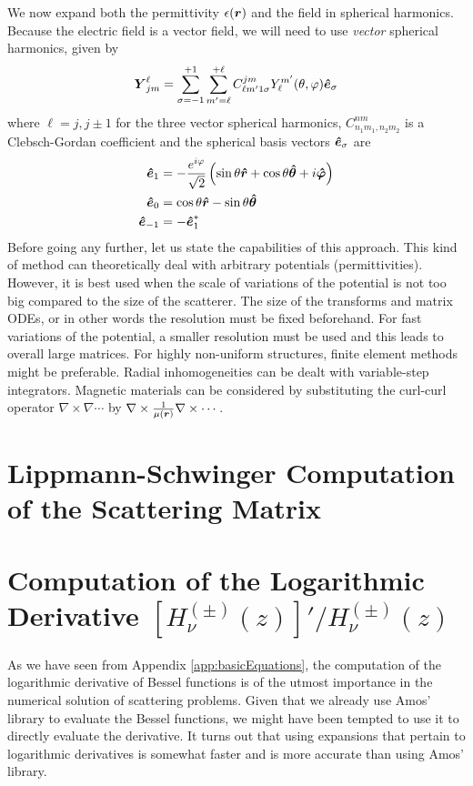We now expand both the permittivity $\epsilon(\boldsymbol{r})$ and the field in
spherical harmonics. Because the electric field is a vector field, 
we will need to use \textit{vector} spherical harmonics, given by
  \begin{equation}
    \boldsymbol{Y}_{jm}^\ell=\sum_{\sigma=-1}^{+1}\sum_{m'=\ell}^{+\ell}C^{jm}_{\ell m'1\sigma}Y_{\ell}^{m'}(\theta,\varphi)\boldsymbol{\hat{e}}_\sigma
  \end{equation}
where $\ell=j,j\pm1$ for the three vector spherical harmonics, $C^{nm}_{n_1m_1,n_2m_2}$
is a Clebsch-Gordan coefficient and the spherical basis vectors $\boldsymbol{\hat{e}}_\sigma$ 
are
  \begin{align}
    \boldsymbol{\hat{e}}_1	&= -\frac{e^{i\varphi}}{\sqrt{2}}\left(\sin\theta\boldsymbol{\hat{r}}+\cos\theta\boldsymbol{\hat{\theta}}+i\boldsymbol{\hat{\varphi}}\right)	\nonumber\\
    \boldsymbol{\hat{e}}_0	&= \cos\theta\boldsymbol{\hat{r}}-\sin\theta\boldsymbol{\hat{\theta}}								\\
    \boldsymbol{\hat{e}}_{-1}&= -\boldsymbol{\hat{e}}_1^*												\nonumber
  \end{align}
Before going any further, let us state the capabilities of this approach. This kind of method
can theoretically deal with arbitrary potentials (permittivities). However, it is best used
when the scale of variations of the potential is not too big compared to the size
of the scatterer. The size of the transforms and matrix ODEs, or in other words the resolution
must be fixed beforehand. For fast variations of the potential, a smaller resolution must be used
and this leads to overall large matrices. For highly non-uniform structures, finite element methods
might be preferable. Radial inhomogeneities can be dealt with variable-step integrators. 
Magnetic materials can be considered by substituting the curl-curl operator $\nabla\times\nabla\cdots$
by $\nabla\times\frac{1}{\mu(\boldsymbol{r})}\nabla\times\cdots$. 

\section{Lippmann-Schwinger Computation of the Scattering Matrix}\label{sec:app.numTools.lippmannSchwinger}
\section{Computation of the Logarithmic Derivative $[H^{(\pm)}_\nu(z)]'/H^{(\pm)}_\nu(z)$}\label{sec:app.numTools.logDeriv}

As we have seen from Appendix \ref{app:basicEquations}, the computation of the logarithmic derivative
of Bessel functions is of the utmost importance in the numerical solution 
of scattering problems. Given that we already use Amos' library \cite{AMO86} to evaluate
the Bessel functions, we might have been tempted to use it 
to directly evaluate the derivative. It turns out that using
expansions that pertain to logarithmic derivatives is somewhat
faster and is more accurate than using Amos' library. 

